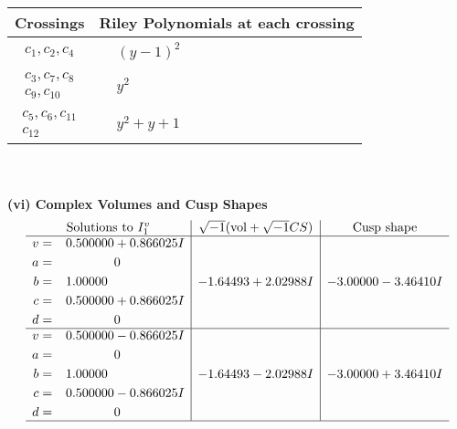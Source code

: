 \documentclass[1p]{elsarticle_modified}
\theoremstyle{definition}
\newcommand{\I}{\sqrt{-1}}
\begin{document}
\begin{tabular}{m{50pt}|m{274pt}}
Crossings & \hspace{64pt}Riley Polynomials at each crossing \\
\hline $$\begin{aligned}c_{1},c_{2},c_{4}\end{aligned}$$&$\begin{aligned}
&(y-1)^2
\end{aligned}$\\
\hline $$\begin{aligned}c_{3},c_{7},c_{8}\\c_{9},c_{10}\end{aligned}$$&$\begin{aligned}
&y^2
\end{aligned}$\\
\hline $$\begin{aligned}c_{5},c_{6},c_{11}\\c_{12}\end{aligned}$$&$\begin{aligned}
&y^2+y+1
\end{aligned}$\\
\hline
\end{tabular}\\~\\
\newpage\flushleft \textbf{(vi) Complex Volumes and Cusp Shapes}
$$\begin{array}{c|c|c}  
\text{Solutions to }I^v_{1}& \I (\text{vol} + \sqrt{-1}CS) & \text{Cusp shape}\\
 \hline 
\begin{aligned}
v &= \phantom{-}0.500000 + 0.866025 I \\
a &= \phantom{-0.000000 } 0 \\
b &= \phantom{-}1.00000\phantom{ +0.000000I} \\
c &= \phantom{-}0.500000 + 0.866025 I \\
d &= \phantom{-0.000000 } 0\end{aligned}
 & -1.64493 + 2.02988 I & -3.00000 - 3.46410 I \\ \hline\begin{aligned}
v &= \phantom{-}0.500000 - 0.866025 I \\
a &= \phantom{-0.000000 } 0 \\
b &= \phantom{-}1.00000\phantom{ +0.000000I} \\
c &= \phantom{-}0.500000 - 0.866025 I \\
d &= \phantom{-0.000000 } 0\end{aligned}
 & -1.64493 - 2.02988 I & -3.00000 + 3.46410 I\\
 \hline 
 \end{array}$$\newpage\newpage\renewcommand{\arraystretch}{1}
\end{document}
